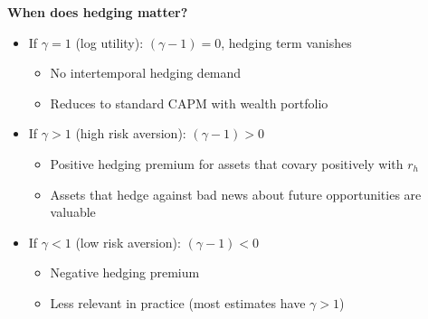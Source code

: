 \documentclass{beamer}
\begin{document}
\begin{frame}[allowframebreaks]
    \framebreak
    
    \textbf{When does hedging matter?}
    
    \begin{itemize}
        \item If $\gamma = 1$ (log utility): $(\gamma-1) = 0$, hedging term vanishes
        \begin{itemize}
            \item No intertemporal hedging demand
            \item Reduces to standard CAPM with wealth portfolio
        \end{itemize}
        
        \item If $\gamma > 1$ (high risk aversion): $(\gamma-1) > 0$
        \begin{itemize}
            \item Positive hedging premium for assets that covary positively with $r_h$
            \item Assets that hedge against bad news about future opportunities are valuable
        \end{itemize}
        
        \item If $\gamma < 1$ (low risk aversion): $(\gamma-1) < 0$
        \begin{itemize}
            \item Negative hedging premium
            \item Less relevant in practice (most estimates have $\gamma > 1$)
        \end{itemize}
    \end{itemize}
\end{frame}
\end{document}
